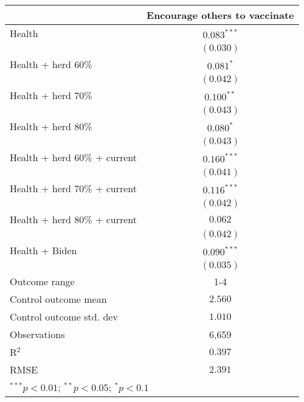 \begin{table}
\begin{center}
\begin{tabular}{l c}
\hline
 & Encourage others to vaccinate \\
\hline
Health                       & $0.083^{***}$ \\
                             & $(0.030)$     \\
Health + herd 60\%           & $0.081^{*}$   \\
                             & $(0.042)$     \\
Health + herd 70\%           & $0.100^{**}$  \\
                             & $(0.043)$     \\
Health + herd 80\%           & $0.080^{*}$   \\
                             & $(0.043)$     \\
Health + herd 60\% + current & $0.160^{***}$ \\
                             & $(0.041)$     \\
Health + herd 70\% + current & $0.116^{***}$ \\
                             & $(0.042)$     \\
Health + herd 80\% + current & $0.062$       \\
                             & $(0.042)$     \\
Health + Biden               & $0.090^{***}$ \\
                             & $(0.035)$     \\
\hline
Outcome range                & 1-4           \\
Control outcome mean         & $2.560$       \\
Control outcome std. dev     & $1.010$       \\
Observations                 & 6,659         \\
R$^{2}$                      & $0.397$       \\
RMSE                         & $2.391$       \\
\hline
\multicolumn{2}{l}{\scriptsize{$^{***}p<0.01$; $^{**}p<0.05$; $^{*}p<0.1$}}
\end{tabular}
\caption{}
\label{table:Tables and Figures/SI_table22_allinfo_pooled_encourage1-4}
\end{center}
\end{table}
